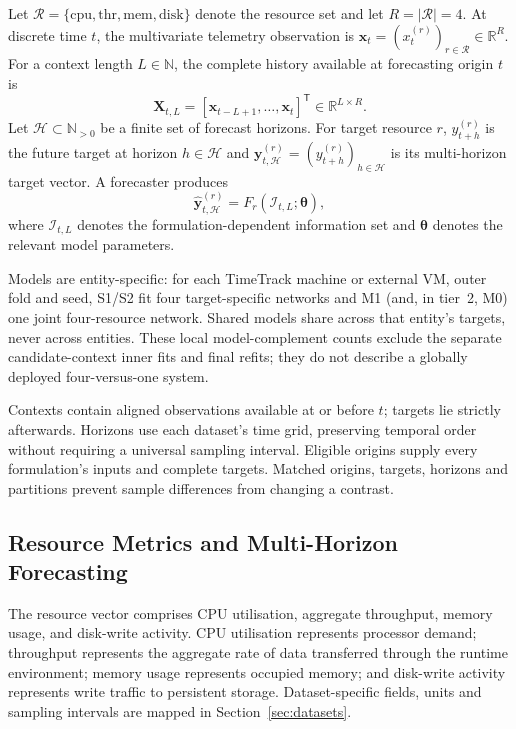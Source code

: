 \documentclass[5p,twocolumn]{elsarticle}
\begin{document}
Let $\mathcal{R}=\{\mathrm{cpu},\mathrm{thr},\mathrm{mem},\mathrm{disk}\}$
denote the resource set and let $R=|\mathcal{R}|=4$. At discrete time $t$,
the multivariate telemetry observation is
$\mathbf{x}_t=(x_t^{(r)})_{r\in\mathcal{R}}\in\mathbb{R}^{R}$. For a context
length $L\in\mathbb{N}$, the complete history available at forecasting origin
$t$ is
\begin{equation}
  \mathbf{X}_{t,L}
  = [\mathbf{x}_{t-L+1},\ldots,\mathbf{x}_{t}]^{\mathsf T}
  \in \mathbb{R}^{L\times R}.
  \label{eq:multiresource-context}
\end{equation}
Let $\mathcal{H}\subset\mathbb{N}_{>0}$ be a finite set of forecast horizons.
For target resource $r$, $y_{t+h}^{(r)}$ is the future target at horizon
$h\in\mathcal{H}$ and
$\mathbf{y}_{t,\mathcal{H}}^{(r)}=(y_{t+h}^{(r)})_{h\in\mathcal{H}}$ is its
multi-horizon target vector. A forecaster produces
\begin{equation}
  \widehat{\mathbf{y}}_{t,\mathcal{H}}^{(r)}
  = F_r(\mathcal{I}_{t,L};\boldsymbol{\theta}),
  \label{eq:forecasting-task}
\end{equation}
where $\mathcal{I}_{t,L}$ denotes the formulation-dependent information set
and $\boldsymbol{\theta}$ denotes the relevant model parameters.

Models are entity-specific: for each TimeTrack machine or external VM,
outer fold and seed, S1/S2 fit four target-specific networks and M1 (and,
in tier~2, M0) one joint four-resource network. Shared models share across
that entity's targets, never across entities. These local model-complement counts exclude the separate
candidate-context inner fits and final refits; they do not describe a
globally deployed four-versus-one system.

Contexts contain aligned observations available at or before $t$; targets lie
strictly afterwards. Horizons use each dataset's time grid, preserving temporal
order without requiring a universal sampling interval. Eligible origins supply
every formulation's inputs and complete targets. Matched origins, targets,
horizons and partitions prevent sample differences from changing a contrast.

\subsection{Resource Metrics and Multi-Horizon Forecasting}
\label{sec:resource-horizons}

The resource vector comprises CPU utilisation, aggregate throughput, memory
usage, and disk-write activity. CPU utilisation represents processor demand;
throughput represents the aggregate rate of data transferred through the
runtime environment; memory usage represents occupied memory; and disk-write
activity represents write traffic to persistent storage. Dataset-specific
fields, units and sampling intervals are mapped in Section~\ref{sec:datasets}.
\end{document}
